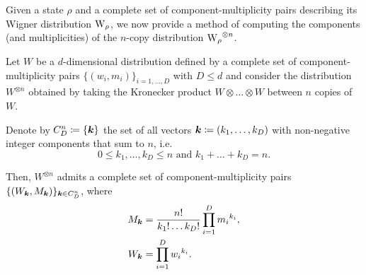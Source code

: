 Given a state $\rho$ and a complete set of component-multiplicity pairs describing its Wigner distribution $\W{\rho}$, we now provide a method of computing the components (and multiplicities) of the $n$-copy distribution $\W{\rho}^{\otimes n}$.
\begin{lemma}\label{lem:ncopycomponents}
	Let $W$ be a $d$-dimensional distribution defined by a complete set of component-multiplicity pairs $\{(w_i, m_i)\}_{i=1,\dots,D}$ with $D \leq d$ and consider the distribution $W^{\otimes n}$ obtained by taking the Kronecker product $W \otimes \dots \otimes W$ between $n$ copies of $W$.
	
	Denote by $C_D^n \coloneqq \{\bm{k}\}$ the set of all vectors $\bm{k} \coloneqq (k_1, \dots, k_D)$ with non-negative integer components that sum to $n$, i.e.
	\begin{equation*}
	0 \leq k_1, \dots, k_D \leq n \text{ and } k_1 + \dots + k_D = n.
	\end{equation*}
	
	Then, $W^{\otimes n}$ admits a complete set of component-multiplicity pairs $\{(W_{\bm{k}}, M_{\bm{k}})\}_{\bm{k} \in C_D^n}$, where
\begin{align}
	M_{\bm{k}} &= \frac{n!}{k_1!\dots k_D!} \prod\limits_{i=1}^D {m_i}^{k_i}, \label{eq:M}\\
	W_{\bm{k}} &= \prod\limits_{i=1}^D {w_i}^{k_i}. \label{eq:W}
\end{align}
\end{lemma}
